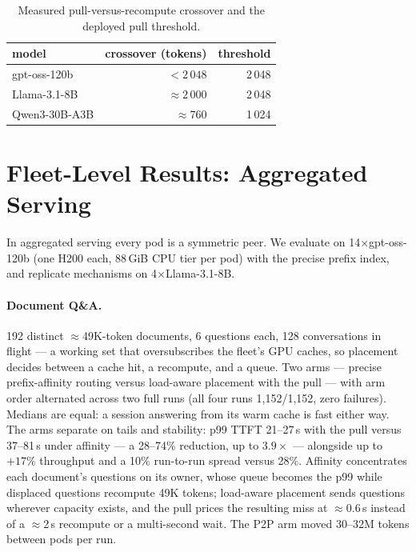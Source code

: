 \documentclass[twocolumn,10pt]{article}
\begin{document}
\begin{table}[t]
  \centering\small
  \caption{Measured pull-versus-recompute crossover and the deployed
  pull threshold.}
  \label{tab:calib}
  \begin{tabular}{lrr}
    \toprule
    model & crossover (tokens) & threshold \\
    \midrule
    gpt-oss-120b & $<2\,048$ & 2\,048 \\
    Llama-3.1-8B & $\approx 2\,000$ & 2\,048 \\
    Qwen3-30B-A3B & $\approx 760$ & 1\,024 \\
    \bottomrule
  \end{tabular}
\end{table}

\section{Fleet-Level Results: Aggregated Serving}
\label{sec:agg}
In aggregated serving every pod is a symmetric peer. We evaluate on
14$\times$gpt-oss-120b (one H200 each, 88\,GiB CPU tier per pod) with
the precise prefix index, and replicate mechanisms on
4$\times$Llama-3.1-8B.

\paragraph{Document Q\&A.} 192 distinct $\approx$49K-token documents,
6 questions each, 128 conversations in flight --- a working set that
oversubscribes the fleet's GPU caches, so placement decides between a
cache hit, a recompute, and a queue. Two arms --- precise
prefix-affinity routing versus load-aware placement with the pull ---
with arm order alternated across two full runs (all four runs
1{,}152/1{,}152, zero failures). Medians are equal: a session answering
from its warm cache is fast either way. The arms separate on tails and
stability: p99 TTFT 21--27\,s with the pull versus 37--81\,s under
affinity --- a 28--74\% reduction, up to $3.9\times$ --- alongside up to
$+17\%$ throughput and a 10\% run-to-run spread versus 28\%.
Affinity concentrates each document's questions on its owner, whose
queue becomes the p99 while displaced questions recompute 49K tokens;
load-aware placement sends questions wherever capacity exists, and the
pull prices the resulting miss at $\approx$0.6\,s instead of a
$\approx$2\,s recompute or a multi-second wait. The P2P arm moved
30--32M tokens between pods per run.
\end{document}
